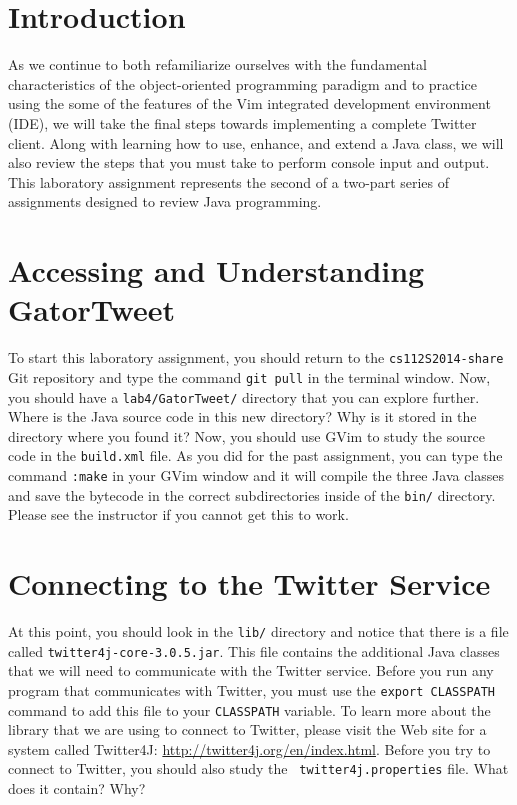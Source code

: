 


\usepackage[compact]{titlesec}



\section*{Introduction}

As we continue to both refamiliarize ourselves with the fundamental characteristics of the object-oriented programming paradigm
and to practice using the some of the features of the Vim integrated development environment (IDE), we will take the final steps
towards implementing a complete Twitter client.  Along with learning how to use, enhance, and extend a Java class, we will also
review the steps that you must take to perform console input and output. This laboratory assignment represents the second of a
two-part series of assignments designed to review Java programming.

\section*{Accessing and Understanding GatorTweet}

To start this laboratory assignment, you should return to the {\tt cs112S2014-share} Git repository and type the command {\tt git
  pull} in the terminal window.  Now, you should have a {\tt lab4/GatorTweet/} directory that you can explore further.  Where is
the Java source code in this new directory? Why is it stored in the directory where you found it? Now, you should use GVim to
study the source code in the {\tt build.xml} file.  As you did for the past assignment, you can type the command {\tt :make} in
your GVim window and it will compile the three Java classes and save the bytecode in the correct subdirectories inside of the
{\tt bin/} directory.  Please see the instructor if you cannot get this to work.

\section*{Connecting to the Twitter Service}

\begin{sloppypar}
  At this point, you should look in the {\tt lib/} directory and notice that there is a file called {\tt twitter4j-core-3.0.5.jar}.
  This file contains the additional Java classes that we will need to communicate with the Twitter service. Before you run any
  program that communicates with Twitter, you must use the {\tt export CLASSPATH} command to add this file to your {\tt CLASSPATH}
  variable.  To learn more about the library that we are using to connect to Twitter, please visit the Web site for a
  system called Twitter4J:
  \url{http://twitter4j.org/en/index.html}. Before you try to connect to Twitter, you should also study the {\tt
    twitter4j.properties} file. What does it contain? Why?
\end{sloppypar}

